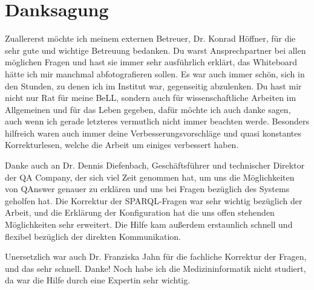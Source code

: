 


\bigskip

\begingroup
\let\clearpage\relax
\let\cleardoublepage\relax
\let\cleardoublepage\relax
\chapter*{Danksagung}

Zuallererst möchte ich meinem externen Betreuer, Dr. Konrad Höffner, für die sehr gute und wichtige Betreuung bedanken.
Du warst Ansprechpartner bei allen möglichen Fragen und hast sie immer sehr ausführlich erklärt, das Whiteboard hätte ich mir manchmal abfotografieren sollen.
Es war auch immer schön, sich in den Stunden, zu denen ich im Institut war, gegenseitig abzulenken.
Du hast mir nicht nur Rat für meine BeLL, sondern auch für wissenschaftliche Arbeiten im Allgemeinen und für das Leben gegeben, dafür möchte ich auch danke sagen, auch wenn ich gerade letzteres vermutlich nicht immer beachten werde.
Besonders hilfreich waren auch immer deine Verbesserungsvorschläge und quasi konstantes Korrekturlesen, welche die Arbeit um einiges verbessert haben.

Danke auch an Dr. Dennis Diefenbach, Geschäftsführer und technischer Direktor der QA Company, der sich viel Zeit genommen hat, um uns die Möglichkeiten von QAnswer genauer zu erklären und uns bei Fragen bezüglich des Systems geholfen hat.
Die Korrektur der SPARQL-Fragen war sehr wichtig bezüglich der Arbeit, und die Erklärung der Konfiguration hat die uns offen stehenden Möglichkeiten sehr erweitert.
Die Hilfe kam außerdem erstaunlich schnell und flexibel bezüglich der direkten Kommunikation.

Unersetzlich war auch Dr. Franziska Jahn für die fachliche Korrektur der Fragen, und das sehr schnell.
Danke!
Noch habe ich die Medizininformatik nicht studiert, da war die Hilfe durch eine Expertin sehr wichtig.

